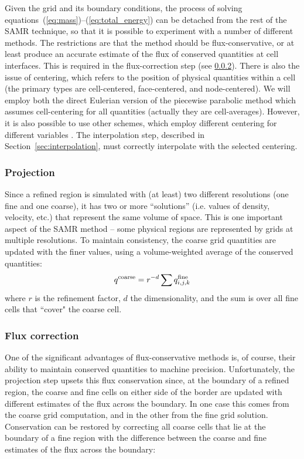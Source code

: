 Given the grid and its boundary conditions, the process of solving
equations~(\ref{eq:mass})--(\ref{eq:total_energy}) can be detached
from the rest of the SAMR technique, so that it is possible to
experiment with a number of different methods.  The restrictions are
that the method should be flux-conservative, or at least produce an
accurate estimate of the flux of conserved quantities at cell
interfaces.  This is required in the flux-correction step (see
\ref{sec:flux_correction}).  There is also the issue of centering,
which refers to the position of physical quantities within a cell (the
primary types are cell-centered, face-centered, and node-centered). We
will employ both the direct Eulerian version of the piecewise
parabolic method \citep{1984JCoPh..54..174C,1995CoPhC..89..149B} which
assumes cell-centering for all quantities (actually they are
cell-averages).  However, it is also possible to use other schemes,
which employ different centering for different variables
\citep[e.g.,][]{Stone92a}.  The interpolation step, described in
Section~\ref{sec:interpolation}, must correctly interpolate with the
selected centering.

\subsubsection{Projection}
\label{sec:projection}

Since a refined region is simulated with (at least) two different resolutions (one fine and one coarse), it has two or
more ``solutions'' (i.e. values of density, velocity, etc.) that represent the same volume of space.  This is one important aspect of the SAMR method -- some physical regions are represented by grids at multiple resolutions.  To
maintain consistency, the coarse grid quantities are updated with the finer values, using a volume-weighted average of the conserved quantities:
\begin{equation}
q^{\rm coarse} = r^{-d} \sum q^{\rm fine}_{i, j,k}
\end{equation}
where $r$ is the refinement factor, $d$ the dimensionality, and the sum is over all fine cells that ``cover" the coarse cell.

\subsubsection{Flux correction}
\label{sec:flux_correction}

One of the significant advantages of flux-conservative methods is, of course, their ability to maintain conserved quantities to machine precision.  Unfortunately, the projection step upsets this flux conservation since, at the boundary of a refined region, the coarse and fine cells on either side of the border are updated with different estimates of the flux across the boundary.  In one case this comes from the coarse grid computation, and in the other from the fine grid solution.  Conservation can be restored by correcting all coarse cells that lie at the boundary of a fine region
with the difference between the coarse and fine estimates of the flux across the boundary:

